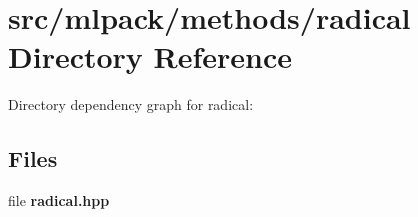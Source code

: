 \section{src/mlpack/methods/radical Directory Reference}
\label{dir_13e038d58c14a3fb94a47aa028202b71}
Directory dependency graph for radical\-:
\subsection*{Files}
\begin{DoxyCompactItemize}
\item 
file {\bf radical.\-hpp}
\end{DoxyCompactItemize}
